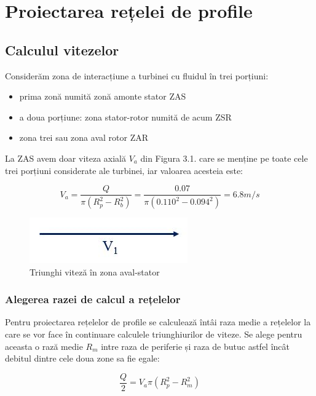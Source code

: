 \chapter{Proiectarea rețelei de profile} \label{chapter:proiectarea}

\section{Calculul vitezelor}

Considerăm zona de interacțiune a turbinei cu fluidul în trei porțiuni:
\begin{itemize}
	\item prima zonă numită zonă amonte stator ZAS
	\item a doua porțiune: zona stator-rotor numită de acum ZSR
	\item zona trei sau zona aval rotor ZAR
\end{itemize}

La ZAS avem doar viteza axială $V_{a}$ din Figura 3.1. care se menține pe toate cele trei porțiuni considerate ale turbinei, iar valoarea acesteia este:

\begin{equation}
V_a=\frac{Q}{\pi(R_{p}^2 - R_{b}^2)} = \frac{0.07}{\pi(0.110^2 - 0.094^2)} = 6.8\si{m/s}
\end{equation}

\begin{figure}[h!]
	\centering
	\includegraphics[scale=0.4]{figures/triunghi_viteza_ZAS.jpg}
	\caption{Triunghi viteză în zona aval-stator}
	\label{Triunghi viteză în zona aval-stator}
\end{figure}

\subsection{Alegerea razei de calcul a rețelelor}

Pentru proiectarea rețelelor de profile se calculează întâi raza medie a rețelelor la care se vor face în continuare calculele triunghiurilor de viteze. Se alege pentru aceasta o rază medie $R_m$ intre raza de periferie și raza de butuc astfel încât debitul dintre cele doua zone sa fie egale:

\begin{equation}
\frac{Q}{2} = V_a \pi (R_p^2 - R_m^2) 
\end{equation}


